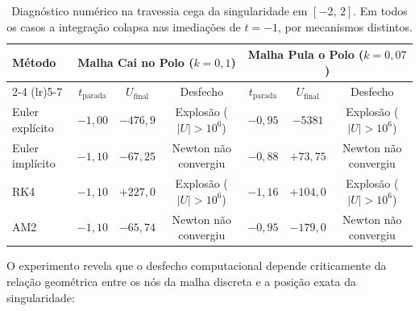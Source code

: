 \documentclass[12pt, a4paper]{article}
\begin{document}
\begin{table}[H]
    \centering
    \footnotesize
    \begin{tabular}{lcccccc}
        \toprule
        \textbf{Método} & \multicolumn{3}{c}{\textbf{Malha Cai no Polo ($k = 0{,}1$)}} & \multicolumn{3}{c}{\textbf{Malha Pula o Polo ($k = 0{,}07$)}} \\
        \cmidrule(lr){2-4} \cmidrule(lr){5-7}
        & $t_{\text{parada}}$ & $U_{\text{final}}$ & Desfecho & $t_{\text{parada}}$ & $U_{\text{final}}$ & Desfecho \\
        \midrule
        Euler explícito & $-1{,}00$ & $-476{,}9$ & Explosão ($|U| > 10^6$) & $-0{,}95$ & $-5381$ & Explosão ($|U| > 10^6$) \\
        Euler implícito & $-1{,}10$ & $-67{,}25$ & Newton não convergiu     & $-0{,}88$ & $+73{,}75$ & Newton não convergiu \\
        RK4             & $-1{,}10$ & $+227{,}0$ & Explosão ($|U| > 10^6$) & $-1{,}16$ & $+104{,}0$ & Explosão ($|U| > 10^6$) \\
        AM2 & $-1{,}10$ & $-65{,}74$ & Newton não convergiu     & $-0{,}95$ & $-179{,}0$ & Newton não convergiu \\
        \bottomrule
    \end{tabular}
    \caption{Diagnóstico numérico na travessia cega da singularidade em $[-2,\,2]$. Em todos os casos a integração colapsa nas imediações de $t=-1$, por mecanismos distintos.}
    \label{tab:m2_2_sd_comparacao}
\end{table}

O experimento revela que o desfecho computacional depende criticamente da relação geométrica entre os nós da malha discreta e a posição exata da singularidade:
\end{document}
